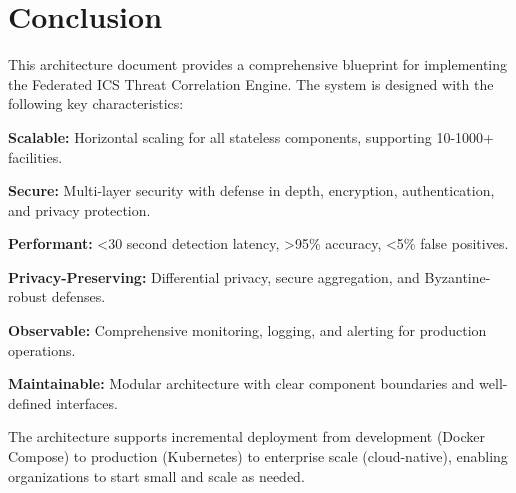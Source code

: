 \documentclass[12pt,a4paper]{article}
\begin{document}
\section{Conclusion}

This architecture document provides a comprehensive blueprint for implementing the Federated ICS Threat Correlation Engine. The system is designed with the following key characteristics:

\textbf{Scalable:} Horizontal scaling for all stateless components, supporting 10-1000+ facilities.

\textbf{Secure:} Multi-layer security with defense in depth, encryption, authentication, and privacy protection.

\textbf{Performant:} <30 second detection latency, >95\% accuracy, <5\% false positives.

\textbf{Privacy-Preserving:} Differential privacy, secure aggregation, and Byzantine-robust defenses.

\textbf{Observable:} Comprehensive monitoring, logging, and alerting for production operations.

\textbf{Maintainable:} Modular architecture with clear component boundaries and well-defined interfaces.

The architecture supports incremental deployment from development (Docker Compose) to production (Kubernetes) to enterprise scale (cloud-native), enabling organizations to start small and scale as needed.
\end{document}

